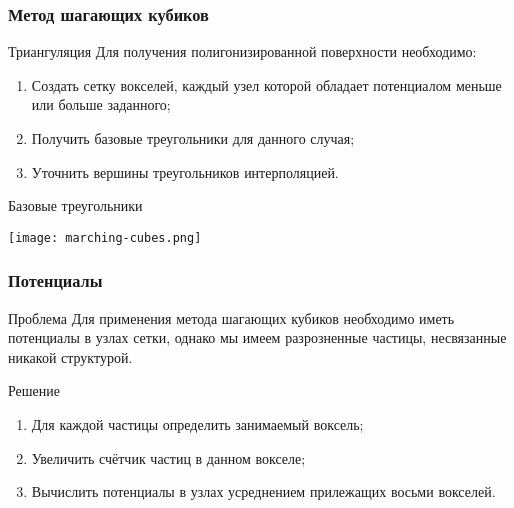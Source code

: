 \begin{frame}
  \frametitle{Метод шагающих кубиков}

  \begin{block}{Триангуляция}
    Для получения полигонизированной поверхности необходимо:
    \begin{enumerate}
      \item Создать сетку вокселей, каждый узел которой обладает потенциалом меньше или больше заданного;
      \item Получить базовые треугольники для данного случая;
      \item Уточнить вершины треугольников интерполяцией.
    \end{enumerate}
  \end{block}

  \begin{block}{Базовые треугольники}
    \begin{center}
      \texttt{[image: marching-cubes.png]}
    \end{center}
  \end{block}
\end{frame}

\begin{frame}
  \frametitle{Потенциалы}

  \begin{block}{Проблема}
    Для применения метода шагающих кубиков необходимо иметь потенциалы в узлах сетки, однако мы имеем разрозненные частицы, несвязанные никакой структурой.
  \end{block}

  \begin{block}{Решение}
    \begin{enumerate}
      \item Для каждой частицы определить занимаемый воксель;
      \item Увеличить счётчик частиц в данном вокселе;
      \item Вычислить потенциалы в узлах усреднением прилежащих восьми вокселей.
    \end{enumerate}
  \end{block}
\end{frame}

